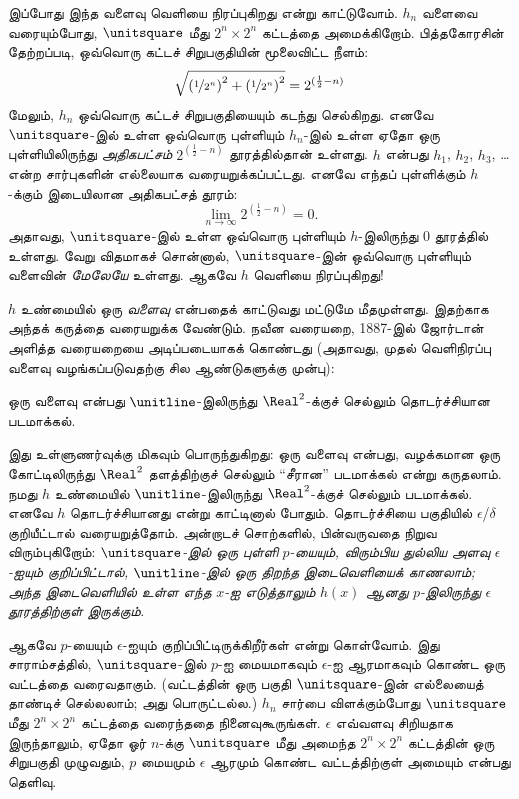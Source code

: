 \documentclass[../../../include/open-logic-section]{subfiles}
\begin{document}
இப்போது இந்த வளைவு வெளியை நிரப்புகிறது என்று
காட்டுவோம். $h_n$ வளைவை வரையும்போது,
$\unitsquare$ மீது $2^n \times 2^n$ கட்டத்தை
அமைக்கிறோம். பித்தகோரசின் தேற்றப்படி, ஒவ்வொரு
கட்டச் சிறுபகுதியின் மூலைவிட்ட நீளம்:
\[
\sqrt{\left(\nicefrac{1}{2^{n}}\right)^2+\left(\nicefrac{1}{2^{n}}\right)^2} = 2^{(\frac{1}{2}-n)}
\]
மேலும், $h_n$ ஒவ்வொரு கட்டச் சிறுபகுதியையும்
கடந்து செல்கிறது. எனவே $\unitsquare$-இல்
உள்ள ஒவ்வொரு புள்ளியும் $h_n$-இல் உள்ள ஏதோ
ஒரு புள்ளியிலிருந்து \emph{அதிகபட்சம்}
$2^{(\frac{1}{2}-n)}$ தூரத்தில்தான் உள்ளது.
$h$ என்பது $h_1$, $h_2$, $h_3$, \dots\@
என்ற சார்புகளின் எல்லையாக வரையறுக்கப்பட்டது.
எனவே எந்தப் புள்ளிக்கும் $h$-க்கும் இடையிலான
அதிகபட்சத் தூரம்:
\[
\lim_{n \rightarrow \infty} 2^{(\frac{1}{2}-n)} = 0.
\]
அதாவது, $\unitsquare$-இல் உள்ள ஒவ்வொரு
புள்ளியும் $h$-இலிருந்து $0$ தூரத்தில் உள்ளது.
வேறு விதமாகச் சொன்னால், $\unitsquare$-இன்
ஒவ்வொரு புள்ளியும் வளைவின் \emph{மேலேயே}
உள்ளது. ஆகவே $h$ வெளியை நிரப்புகிறது!{}

$h$ உண்மையில் ஒரு \emph{வளைவு} என்பதைக்
காட்டுவது மட்டுமே மீதமுள்ளது. இதற்காக அந்தக்
கருத்தை வரையறுக்க வேண்டும். நவீன வரையறை,
1887-இல் ஜோர்டான் அளித்த வரையறையை அடிப்படையாகக்
கொண்டது (அதாவது, முதல் வெளிநிரப்பு வளைவு
வழங்கப்படுவதற்கு சில ஆண்டுகளுக்கு முன்பு):

\begin{defn}
ஒரு வளைவு என்பது $\unitline$-இலிருந்து
$\Real^2$-க்குச் செல்லும் தொடர்ச்சியான படமாக்கல்.
\end{defn}

இது உள்ளுணர்வுக்கு மிகவும் பொருந்துகிறது:
ஒரு வளைவு என்பது, வழக்கமான ஒரு கோட்டிலிருந்து
$\Real^2$ தளத்திற்குச் செல்லும் “சீரான”
படமாக்கல் என்று கருதலாம். நமது $h$ உண்மையில்
$\unitline$-இலிருந்து $\Real^2$-க்குச்
செல்லும் படமாக்கல். எனவே $h$ தொடர்ச்சியானது
என்று காட்டினால் போதும். தொடர்ச்சியை
 பகுதியில் $\epsilon$/$\delta$
குறியீட்டால் வரையறுத்தோம். அன்றாடச் சொற்களில்,
பின்வருவதை நிறுவ விரும்புகிறோம்:
\emph{$\unitsquare$-இல் ஒரு புள்ளி $p$-யையும்,
விரும்பிய துல்லிய அளவு $\epsilon$-ஐயும்
குறிப்பிட்டால், $\unitline$-இல் ஒரு திறந்த
இடைவெளியைக் காணலாம்; அந்த இடைவெளியில் உள்ள
எந்த $x$-ஐ எடுத்தாலும் $h(x)$ ஆனது $p$-இலிருந்து
$\epsilon$ தூரத்திற்குள் இருக்கும்.}

ஆகவே $p$-யையும் $\epsilon$-ஐயும்
குறிப்பிட்டிருக்கிறீர்கள் என்று கொள்வோம்.
இது சாராம்சத்தில், $\unitsquare$-இல் $p$-ஐ
மையமாகவும் $\epsilon$-ஐ ஆரமாகவும் கொண்ட
ஒரு வட்டத்தை வரைவதாகும். (வட்டத்தின் ஒரு பகுதி
$\unitsquare$-இன் எல்லையைத் தாண்டிச்
செல்லலாம்; அது பொருட்டல்ல.) $h_n$ சார்பை
விளக்கும்போது $\unitsquare$ மீது
$2^n \times 2^n$ கட்டத்தை வரைந்ததை
நினைவுகூருங்கள். $\epsilon$ எவ்வளவு
சிறியதாக இருந்தாலும், ஏதோ ஓர் $n$-க்கு
$\unitsquare$ மீது அமைந்த $2^n \times 2^n$
கட்டத்தின் ஒரு சிறுபகுதி முழுவதும்,
$p$ மையமும் $\epsilon$ ஆரமும் கொண்ட
வட்டத்திற்குள் அமையும் என்பது தெளிவு.
\end{document}
